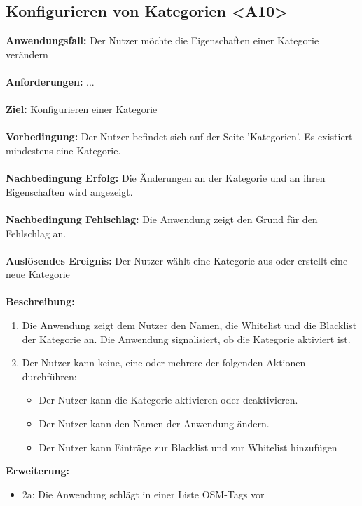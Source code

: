 \documentclass[parskip=full]{scrartcl} %
\begin{document}
\subsection*{Konfigurieren von Kategorien <A10>}
\textbf{Anwendungsfall:} Der Nutzer möchte die Eigenschaften einer Kategorie verändern\\\\
\textbf{Anforderungen:} ...\\\\
\textbf{Ziel:} Konfigurieren einer Kategorie \\\\
\textbf{Vorbedingung:} Der Nutzer befindet sich auf der Seite 'Kategorien'. Es existiert mindestens eine Kategorie.\\\\
\textbf{Nachbedingung Erfolg:} Die Änderungen an der Kategorie und an ihren Eigenschaften wird angezeigt. \\\\
\textbf{Nachbedingung Fehlschlag:} Die Anwendung zeigt den Grund für den Fehlschlag an. \\\\
\textbf{Auslösendes Ereignis:} Der Nutzer wählt eine Kategorie aus oder erstellt eine neue Kategorie \\\\
\textbf{Beschreibung:}
\begin{enumerate}
    \item Die Anwendung zeigt dem Nutzer den Namen, die Whitelist und die Blacklist der Kategorie an. Die Anwendung signalisiert, ob die Kategorie aktiviert ist.
    \item Der Nutzer kann keine, eine oder mehrere der folgenden Aktionen durchführen:
    \begin{itemize}
        \item Der Nutzer kann die Kategorie aktivieren oder deaktivieren.
        \item Der Nutzer kann den Namen der Anwendung ändern.
        \item Der Nutzer kann Einträge zur Blacklist und zur Whitelist hinzufügen
    \end{itemize}
\end{enumerate}
\textbf{Erweiterung:}
\begin{itemize}
        \item 2a: Die Anwendung schlägt in einer Liste OSM-Tags vor
    \end{itemize}
\newpage
\end{document}
